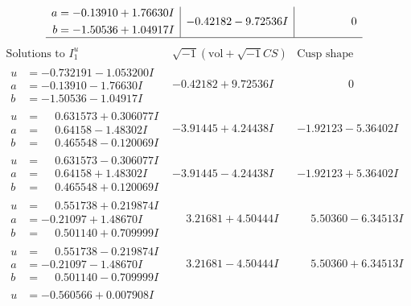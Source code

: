 \documentclass[1p]{elsarticle_modified}
\theoremstyle{definition}
\newcommand{\I}{\sqrt{-1}}
\begin{document}
$$\begin{array}{c|c|c}
\begin{aligned}
a &= -0.13910 + 1.76630 I \\
b &= -1.50536 + 1.04917 I\end{aligned}
 & -0.42182 - 9.72536 I & \phantom{-0.000000 } 0\\
 \hline 
 \end{array}$$\newpage$$\begin{array}{c|c|c}  
\text{Solutions to }I^u_{1}& \I (\text{vol} + \sqrt{-1}CS) & \text{Cusp shape}\\
 \hline 
\begin{aligned}
u &= -0.732191 - 1.053200 I \\
a &= -0.13910 - 1.76630 I \\
b &= -1.50536 - 1.04917 I\end{aligned}
 & -0.42182 + 9.72536 I & \phantom{-0.000000 } 0 \\ \hline\begin{aligned}
u &= \phantom{-}0.631573 + 0.306077 I \\
a &= \phantom{-}0.64158 - 1.48302 I \\
b &= \phantom{-}0.465548 - 0.120069 I\end{aligned}
 & -3.91445 + 4.24438 I & -1.92123 - 5.36402 I \\ \hline\begin{aligned}
u &= \phantom{-}0.631573 - 0.306077 I \\
a &= \phantom{-}0.64158 + 1.48302 I \\
b &= \phantom{-}0.465548 + 0.120069 I\end{aligned}
 & -3.91445 - 4.24438 I & -1.92123 + 5.36402 I \\ \hline\begin{aligned}
u &= \phantom{-}0.551738 + 0.219874 I \\
a &= -0.21097 + 1.48670 I \\
b &= \phantom{-}0.501140 + 0.709999 I\end{aligned}
 & \phantom{-}3.21681 + 4.50444 I & \phantom{-}5.50360 - 6.34513 I \\ \hline\begin{aligned}
u &= \phantom{-}0.551738 - 0.219874 I \\
a &= -0.21097 - 1.48670 I \\
b &= \phantom{-}0.501140 - 0.709999 I\end{aligned}
 & \phantom{-}3.21681 - 4.50444 I & \phantom{-}5.50360 + 6.34513 I \\ \hline\begin{aligned}
u &= -0.560566 + 0.007908 I \\

\end{aligned}
\end{array}$$
\end{document}
